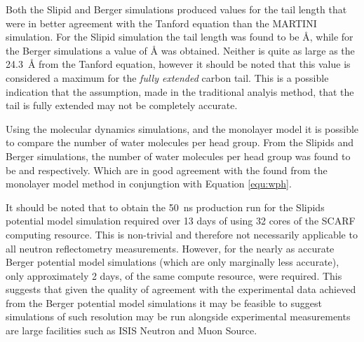 \documentclass[amsmath,amssymb,twocolumn,superscriptaddress,aps,prl]{revtex4-1}
\begin{document}
Both the Slipid and Berger simulations produced values for the tail length that were in better agreement with the Tanford equation than the MARTINI simulation.
For the Slipid simulation the tail length was found to be \si{\angstrom}, while for the Berger simulations a value of \si{\angstrom} was obtained.
Neither is quite as large as the \SI{24.3}{\angstrom} from the Tanford equation, however it should be noted that this value is considered a maximum for the \emph{fully extended} carbon tail.
This is a possible indication that the assumption, made in the traditional analyis method, that the tail is fully extended may not be completely accurate.

Using the molecular dynamics simulations, and the monolayer model it is possible to compare the number of water molecules per head group.
From the Slipids and Berger simulations, the number of water molecules per head group was found to be  and  respectively.
Which are in good agreement with the  found from the monolayer model method in conjungtion with Equation \ref{equ:wph}.

It should be noted that to obtain the \SI{50}{\nano\second} production run for the Slipids potential model simulation required over 13 days of using 32 cores of the SCARF computing resource.
This is non-trivial and therefore not necessarily applicable to all neutron reflectometry measurements.
However, for the nearly as accurate Berger potential model simulations (which are only marginally less accurate), only approximately 2 days, of the same compute resource, were required.
This suggests that given the quality of agreement with the experimental data achieved from the Berger potential model simulations it may be feasible to suggest simulations of such resolution may be run alongside experimental measurements are large facilities such as ISIS Neutron and Muon Source.
\end{document}
